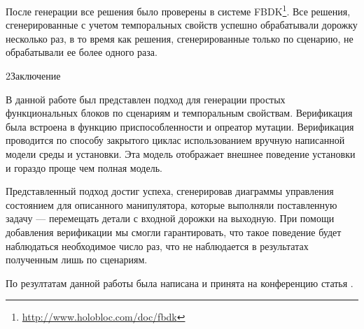 \documentclass[14pt]{extarticle}
\makeatletter
\theoremstyle{plain}
\theoremstyle{definition}
\renewcommand{\subsection}{\@startsection{subsection}{2}{0mm}%
{2\baselineskip}{\baselineskip}{\bfseries\large\itshape}}
\makeatother
\begin{document}
После генерации все решения было проверены в системе FBDK\footnote{\url{http://www.holobloc.com/doc/fbdk}}.
Все решения, сгенерированные с учетом темпоральных свойств успешно обрабатывали дорожку несколько раз,
в то время как решения, сгенерированные только по сценарию, не обрабатывали ее более одного раза.

\subsection{Заключение}

В данной работе был представлен подход для генерации простых функциональных блоков по
сценариям и темпоральным свойствам. Верификация была встроена в функцию приспособленности и
опреатор мутации. Верификация проводится по способу закрытого циклас использованием
вручную написанной модели среды и установки. Эта модель отображает внешнее поведение
установки и гораздо проще чем полная модель.

Представленный подход достиг успеха, сгенерировав диаграммы управления состоянием для
описанного манипулятора, которые выполняли поставленную задачу --- перемещать детали
с входной дорожки на выходную. При помощи добавления верификации мы смогли гарантировать,
что такое поведение будет наблюдаться необходимое число раз, что не наблюдается в
результатах полученным лишь по сценариям.

По резултатам данной работы была написана и принята на конференцию статья \cite{this}.

\pagebreak
\end{document}

